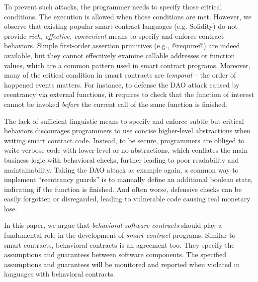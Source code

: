 

To prevent such attacks, the programmer needs to specify those critical
conditions. The execution is allowed when those conditions are met.
However, we observe that existing popular smart contract languages (e.g.
Solidity) do not provide \emph{rich, effective, convenient} means to specify
and enforce contract behaviors.
Simple first-order assertion primitives (e.g., @require@) are indeed available,
but they cannot effectively examine callable addresses or function values, which
are a common pattern used in smart contract programs.
Moreover, many of the critical condition in smart contracts are \emph{temporal}
-- the order of happened events matters.
For instance, to defense the DAO attack caused by reentrancy via
external functions, it requires to check that the function of interest cannot
be invoked \emph{before} the current call of the same function is finished.

The lack of sufficient linguistic means to specify and enforce subtle but
critical behaviors discourages programmers to use concise higher-level
abstractions when writing smart contract code.
Instead, to be secure, programmers are obliged to write verbose code with
lower-level or no abstractions, which conflates the main business logic with
behavioral checks, further leading to poor readability and maintainability.
Taking the DAO attack as example again, a common way to implement ``reentrancy
guards'' is to manually define an additional boolean state, indicating
if the function is finished.
And often worse, defensive checks can be easily forgotten or disregarded,
leading to vulnerable code causing real monetary lose.

In this paper, we argue that \emph{behavioral software contracts}
\cite{DBLP:conf/tools/Meyer98a} should play a fundamental role in the
development of \emph{smart contract} programs.  Similar to smart contracts,
behavioral contracts is an agreement too. They specify the assumptions and
guarantees between software components. The specified assumptions and
guarantees will be monitored and reported when violated in languages with
behavioral contracts.

